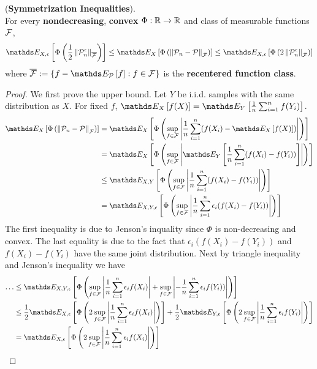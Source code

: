 \documentclass[11pt]{article}
\begin{document}
\begin{itemize}
\begin{proposition} (\textbf{Symmetrization Inequalities}). \citep{wellner2013weak, boucheron2013concentration, vershynin2018high, wainwright2019high}\\
For every \textbf{nondecreasing}, \textbf{convex} $\Phi: {\mathbb R} \to {\mathbb R}$ and class of measurable functions ${\mathcal F}$,
\begin{align}
\E{X, \epsilon}{\Phi\paren{\frac{1}{2}\norm{\cP_n^{\epsilon}}{\overline{\cF}}}} \le \E{X}{\Phi\paren{\norm{\cP_n - \cP}{\cF}}} \le \E{X, \epsilon}{\Phi\paren{2\norm{\cP_n^{\epsilon}}{\cF}}} \label{ineqn: symmetrization_inequality}
\end{align} where $\overline{\cF} := \set{f - \E{\cP}{f}: f\in \cF}$ is the \textbf{recentered function class}.
\end{proposition}
\begin{proof}
We first prove the upper bound. Let $Y$ be i.i.d. samples with the same distribution as $X$. For fixed $f$, $\E{X}{f(X)} = \E{Y}{\frac{1}{n}\sum_{i=1}^nf(Y_i)}$.
\begin{align*}
\E{X}{\Phi\paren{\norm{\cP_n - \cP}{\cF}}} &= \E{X}{\Phi\paren{\sup_{f\in \cF}\abs{\frac{1}{n}\sum_{i=1}^n (f(X_i) - \E{X}{f(X)})}}}\\
&= \E{X}{\Phi\paren{\sup_{f\in \cF}\abs{\E{Y}{\frac{1}{n}\sum_{i=1}^n (f(X_i) - f(Y_i))}}}}\\
&\le \E{X, Y}{\Phi\paren{\sup_{f\in \cF}\abs{\frac{1}{n}\sum_{i=1}^n (f(X_i) - f(Y_i))} }}\\
&= \E{X, Y, \epsilon}{\Phi\paren{\sup_{f\in \cF}\abs{ \frac{1}{n}\sum_{i=1}^n \epsilon_i (f(X_i) - f(Y_i))}}}
\end{align*} The first inequality is due to Jenson's inquality since $\Phi$ is non-decreasing and convex. The last equality is due to the fact that $\epsilon_i(f(X_i) - f(Y_i))$ and $f(X_i) - f(Y_i)$ have the same joint distribution. Next by triangle inequality and Jenson's inequality  we have
\begin{align*}
\ldots & \le \E{X, Y, \epsilon}{\Phi\paren{\sup_{f\in \cF}\abs{ \frac{1}{n}\sum_{i=1}^n \epsilon_i f(X_i)} +\sup_{f\in \cF} \abs{- \frac{1}{n}\sum_{i=1}^n \epsilon_i f(Y_i))}}}\\
&\le  \frac{1}{2}\E{X, \epsilon}{\Phi\paren{2\sup_{f\in \cF}\abs{ \frac{1}{n}\sum_{i=1}^n \epsilon_i f(X_i) }}} +   \frac{1}{2}\E{Y, \epsilon}{\Phi\paren{2\sup_{f\in \cF}\abs{ \frac{1}{n}\sum_{i=1}^n \epsilon_i f(Y_i)}}} \\
&= \E{X, \epsilon}{\Phi\paren{2\sup_{f\in \cF}\abs{ \frac{1}{n}\sum_{i=1}^n \epsilon_i f(X_i) }}}

\end{align*}
\end{proof}
\end{itemize}
\end{document}
